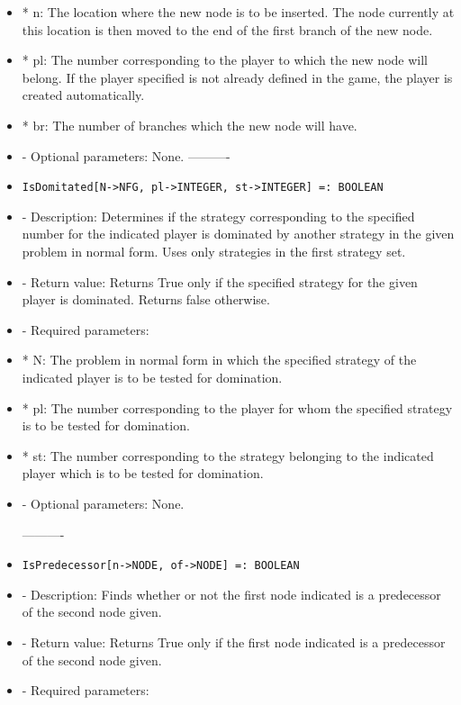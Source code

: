 \begin{itemize}
\bd
\item
*  n:  The location where the new node is to be inserted.  The node
currently at this location is then moved to the end of the first
branch of the new node.
\item
*  pl:  The number corresponding to the player to which the new node
will belong.  If the player specified is not already defined in	the
game, the player is created automatically.
\item
*  br:  The number of branches which the new node will have.
\ed

\item
- Optional parameters:  None.
\ed
----------
\item
\begin{verbatim}
IsDomitated[N->NFG, pl->INTEGER, st->INTEGER] =: BOOLEAN
\end{verbatim}

\bd
\item
- Description:  Determines if the strategy corresponding to the specified
number for the indicated player is dominated by another strategy in the
given problem in normal form.  Uses only strategies in the first 
strategy set.
\item
- Return value:  Returns True only if the specified strategy for the 
given player is dominated.  Returns false otherwise.
\item
- Required parameters:

\bd
\item
*  N:  The problem in normal form in which the specified strategy of
the indicated player is to be tested for domination.
\item
*  pl:  The number corresponding to the player for whom the specified
strategy is to be tested for domination.
\item
*  st:  The number corresponding to the strategy belonging to the 
indicated player which is to be tested for domination.
\ed

\item
- Optional parameters:  None.
\ed

----------

\item
\begin{verbatim}
IsPredecessor[n->NODE, of->NODE] =: BOOLEAN
\end{verbatim}

\bd
\item
- Description:  Finds whether or not the first node indicated is a 
predecessor of the second node given.
\item
- Return value:  Returns True only if the first node indicated is a
predecessor of the second node given.
\item
- Required parameters:


\end{itemize}
